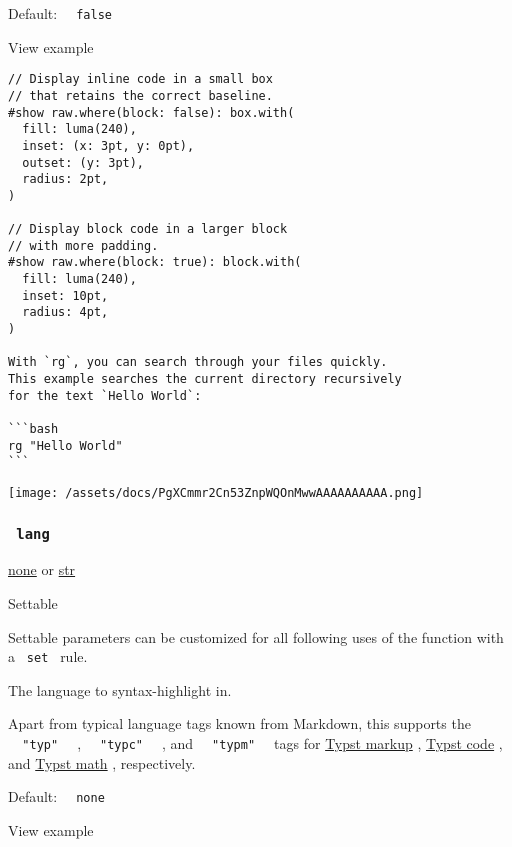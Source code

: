 Default: \texttt{\ }{\texttt{\ false\ }}\texttt{\ }


View example

\begin{verbatim}
// Display inline code in a small box
// that retains the correct baseline.
#show raw.where(block: false): box.with(
  fill: luma(240),
  inset: (x: 3pt, y: 0pt),
  outset: (y: 3pt),
  radius: 2pt,
)

// Display block code in a larger block
// with more padding.
#show raw.where(block: true): block.with(
  fill: luma(240),
  inset: 10pt,
  radius: 4pt,
)

With `rg`, you can search through your files quickly.
This example searches the current directory recursively
for the text `Hello World`:

```bash
rg "Hello World"
```
\end{verbatim}

\texttt{[image: /assets/docs/PgXCmmr2Cn53ZnpWQOnMwwAAAAAAAAAA.png]}

\subsubsection{\texorpdfstring{\texttt{\ lang\ }}{ lang }}\label{parameters-lang}

\href{/docs/reference/foundations/none/}{none} {or}
\href{/docs/reference/foundations/str/}{str}

{{ Settable }}

\label{parameters-lang-settable-tooltip}
Settable parameters can be customized for all following uses of the
function with a \texttt{\ set\ } rule.

The language to syntax-highlight in.

Apart from typical language tags known from Markdown, this supports the
\texttt{\ }{\texttt{\ "typ"\ }}\texttt{\ } ,
\texttt{\ }{\texttt{\ "typc"\ }}\texttt{\ } , and
\texttt{\ }{\texttt{\ "typm"\ }}\texttt{\ } tags for
\href{/docs/reference/syntax/\#markup}{Typst markup} ,
\href{/docs/reference/syntax/\#code}{Typst code} , and
\href{/docs/reference/syntax/\#math}{Typst math} , respectively.

Default: \texttt{\ }{\texttt{\ none\ }}\texttt{\ }


View example

